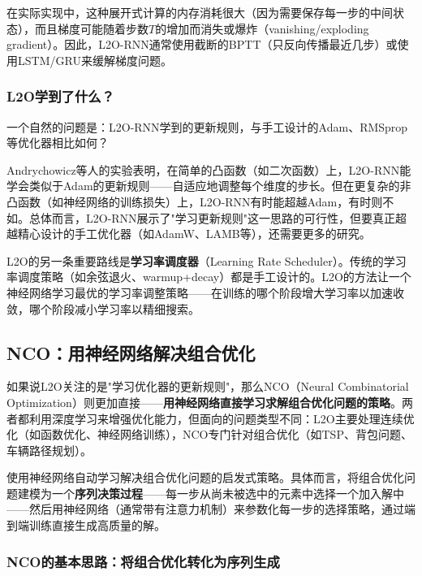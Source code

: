 \documentclass[lang=cn,zihao=-4,a4paper,fontset=windows]{beautybook}
\begin{document}
在实际实现中，这种展开式计算的内存消耗很大（因为需要保存每一步的中间状态），而且梯度可能随着步数$T$的增加而消失或爆炸（vanishing/exploding gradient）。因此，L2O-RNN通常使用截断的BPTT（只反向传播最近几步）或使用LSTM/GRU来缓解梯度问题。

\subsubsection{L2O学到了什么？}

一个自然的问题是：L2O-RNN学到的更新规则，与手工设计的Adam、RMSprop等优化器相比如何？

Andrychowicz等人的实验表明，在简单的凸函数（如二次函数）上，L2O-RNN能学会类似于Adam的更新规则——自适应地调整每个维度的步长。但在更复杂的非凸函数（如神经网络的训练损失）上，L2O-RNN有时能超越Adam，有时则不如。总体而言，L2O-RNN展示了"学习更新规则"这一思路的可行性，但要真正超越精心设计的手工优化器（如AdamW、LAMB等），还需要更多的研究。

L2O的另一条重要路线是\textbf{学习率调度器}（Learning Rate Scheduler）。传统的学习率调度策略（如余弦退火、warmup+decay）都是手工设计的。L2O的方法让一个神经网络学习最优的学习率调整策略——在训练的哪个阶段增大学习率以加速收敛，哪个阶段减小学习率以精细搜索。

\subsection{NCO：用神经网络解决组合优化}

如果说L2O关注的是"学习优化器的更新规则"，那么NCO（Neural Combinatorial Optimization）则更加直接——\textbf{用神经网络直接学习求解组合优化问题的策略}。两者都利用深度学习来增强优化能力，但面向的问题类型不同：L2O主要处理连续优化（如函数优化、神经网络训练），NCO专门针对组合优化（如TSP、背包问题、车辆路径规划）。

\begin{definition}
使用神经网络自动学习解决组合优化问题的启发式策略。具体而言，将组合优化问题建模为一个\textbf{序列决策过程}——每一步从尚未被选中的元素中选择一个加入解中——然后用神经网络（通常带有注意力机制）来参数化每一步的选择策略，通过端到端训练直接生成高质量的解。
\end{definition}

\subsubsection{NCO的基本思路：将组合优化转化为序列生成}
\end{document}
